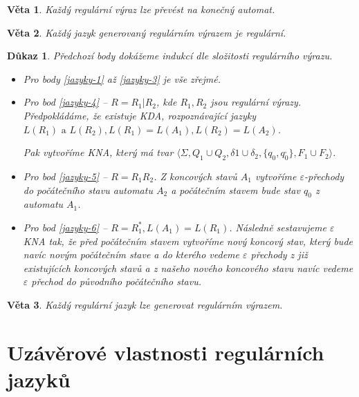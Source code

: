 \documentclass[10pt, a4paper, titlepage]{article}
\theoremstyle{note}
\newtheorem{dukaz}{Důkaz}
\newtheorem{veta}{Věta}
\begin{document}
\begin{veta}
Každý regulární výraz lze převést na konečný automat.
\end{veta}

\begin{veta}
Každý jazyk generovaný regulárním výrazem je regulární.
\end{veta}

\begin{dukaz}
Předchozí body dokážeme indukcí dle složitosti regulárního výrazu.

\begin{itemize}
\item
Pro body \ref{jazyky-1} až \ref{jazyky-3} je vše zřejmé.

\item
Pro bod \ref{jazyky-4} -- $R=R_{1}|R_{2}$, kde $R_{1}, R_{2}$ jsou regulární výrazy. Předpokládáme, že existuje KDA, rozpoznávající
jazyky $L(R_{1}) \text{ a } L(R_{2}), L(R_{1}) = L(A_{1}), L(R_{2}) = L(A_{2})$.

Pak vytvoříme KNA, který má tvar $\langle \Sigma, Q_{1} \cup Q_{2}, \delta{1} \cup \delta_{2}, \lbrace q_{0}, q_{0}^{,} \rbrace, F_{1} \cup F_{2} \rangle$.

\item
Pro bod \ref{jazyky-5}  -- $R=R_{1}R_{2}$. Z koncových stavů $A_{1}$ vytvoříme $\varepsilon$-přechody do počátečního stavu automatu $A_{2}$ a počátečním stavem
bude stav $q_{0}$ z automatu $A_{1}$.

\item
Pro bod \ref{jazyky-6} -- $R=R_{1}^{*}, L(A_{1})=L(R_{1})$. Následně sestavujeme $\varepsilon$ KNA tak, že před počátečním stavem vytvoříme
nový koncový stav, který bude navíc novým počátečním stave a do kterého vedeme $\varepsilon$ přechody z již existujících koncových stavů a z našeho nového koncového stavu navíc vedeme
$\varepsilon$ přechod do původního počátečního stavu.
\end{itemize}
\end{dukaz}

\begin{veta}
Každý regulární jazyk lze generovat regulárním výrazem.
\end{veta}

\section{Uzávěrové vlastnosti regulárních jazyků}
\end{document}
